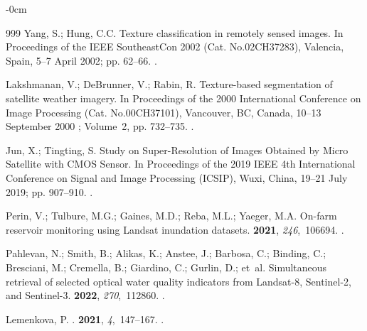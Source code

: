 \documentclass[jimaging,article,accept,pdftex,moreauthors]{Definitions/mdpi}
\begin{document}
\begin{adjustwidth}{-\extralength}{0cm}
\begin{thebibliography}{999}
Yang, S.; Hung, C.C.
\newblock Texture classification in remotely sensed images.
\newblock In Proceedings of the IEEE SoutheastCon 2002 (Cat.
  No.02CH37283), Valencia, Spain, 5--7 April 2002; pp. 62--66.
. %

Lakshmanan, V.; DeBrunner, V.; Rabin, R.
\newblock Texture-based segmentation of satellite weather imagery.
\newblock In Proceedings of the 2000 International Conference on
  Image Processing (Cat. No.00CH37101), Vancouver, BC, Canada, 10--13 September 2000%
; Volume~2, pp. 732--735.
.

Jun, X.; Tingting, S.
\newblock Study on Super-Resolution of Images Obtained by Micro Satellite with
  CMOS Sensor.
\newblock In Proceedings of the 2019 IEEE 4th International Conference on
  Signal and Image Processing (ICSIP), Wuxi, China, 19--21 July 2019; pp. 907--910.
. %

Perin, V.; Tulbure, M.G.; Gaines, M.D.; Reba, M.L.; Yaeger, M.A.
\newblock On-farm reservoir monitoring using Landsat inundation datasets.
 {\bf 2021}, {\em 246},~106694.
.

Pahlevan, N.; Smith, B.; Alikas, K.; Anstee, J.; Barbosa, C.; Binding, C.;
  Bresciani, M.; Cremella, B.; Giardino, C.; Gurlin, D.;  et~al.
\newblock Simultaneous retrieval of selected optical water quality indicators
  from Landsat-8, Sentinel-2, and Sentinel-3.
 {\bf 2022}, {\em 270},~112860.
.

Lemenkova, P.
.
 {\bf 2021}, {\em
  4},~147--167.
.


\end{thebibliography}
\end{adjustwidth}
\end{document}
